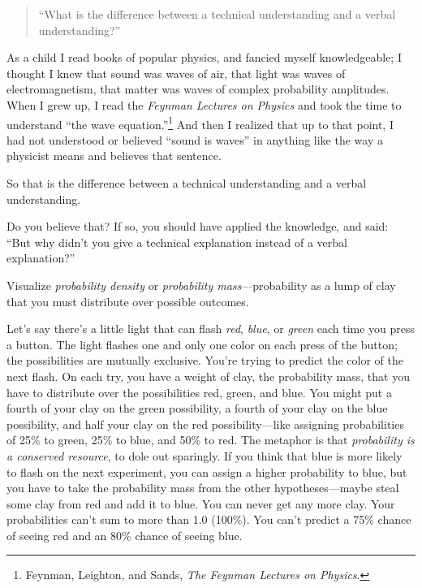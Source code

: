 \begin{quote}
{
 ``What is the difference between a technical
  understanding and a verbal understanding?''}
\end{quote}

{
 As a child I read books of popular physics, and fancied myself
knowledgeable; I thought I knew that sound was waves of air, that light
was waves of electromagnetism, that matter was waves of complex
probability amplitudes. When I grew up, I read the \textit{Feynman
Lectures on Physics} and took the time to understand
``the wave
equation.''\footnote{Feynman, Leighton, and Sands, \textit{The Feynman Lectures on
Physics}.} And then I realized
that up to that point, I had not understood or believed
``sound is waves'' in anything like
the way a physicist means and believes that sentence.}

{
 So that is the difference between a technical understanding and a
verbal understanding.}

{
 Do you believe that? If so, you should have applied the knowledge,
and said: ``But why didn't you give a
technical explanation instead of a verbal
explanation?''}

\hr

{
 Visualize \textit{probability density} or \textit{probability
mass}{}---probability as a lump of clay that you must distribute over
possible outcomes.}

{
 Let's say there's a little light
that can flash \textit{red}, \textit{blue}, or \textit{green} each time
you press a button. The light flashes one and only one color on each
press of the button; the possibilities are mutually exclusive.
You're trying to predict the color of the next flash.
On each try, you have a weight of clay, the probability mass, that you
have to distribute over the possibilities red, green, and blue. You
might put a fourth of your clay on the green possibility, a fourth of
your clay on the blue possibility, and half your clay on the red
possibility---like assigning probabilities of 25\% to green, 25\% to
blue, and 50\% to red. The metaphor is that \textit{probability is a
conserved resource}, to dole out sparingly. If you think that blue is
more likely to flash on the next experiment, you can assign a higher
probability to blue, but you have to take the probability mass from the
other hypotheses---maybe steal some clay from red and add it to blue.
You can never get any more clay. Your probabilities
can't sum to more than 1.0 (100\%). You
can't predict a 75\% chance of seeing red and an 80\%
chance of seeing blue.}

